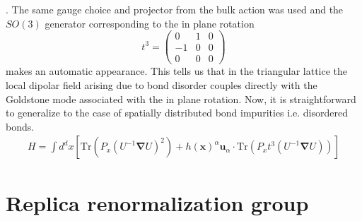 \documentclass[notitlepage,onecolumn,showpacs,11pt]{revtex4-1}
\newcommand{\mbf}[1]{\mathbf{#1}}
\newcommand{\grad}{\boldsymbol{\nabla}}
\newcommand{\Tr}{\text{Tr}}
\begin{document}
. The same gauge choice and projector from the bulk action was used and the 
$SO(3)$ generator corresponding to the in plane rotation
\begin{equation}
    t^3=\begin{pmatrix}0&1&0\\-1&0&0\\0&0&0\end{pmatrix}
\end{equation}
makes an automatic appearance. This tells us that in the triangular lattice 
the local dipolar field arising due to bond disorder couples directly with 
the Goldstone mode associated with the in plane rotation. Now, it is 
straightforward to generalize to the case of spatially distributed bond 
impurities i.e. disordered bonds.
\begin{equation}
    \begin{aligned}
        H = \int d^dx\left[
            \Tr\left(P_x(U^{-1}\grad U)^2\right)
            +h(\mbf{x})^\alpha
            \mbf{u}_\alpha
            \cdot\Tr\left(P_xt^3(U^{-1}\grad U)\right)
        \right]
    \end{aligned}
\end{equation}

\section{Replica renormalization group}
\end{document}
